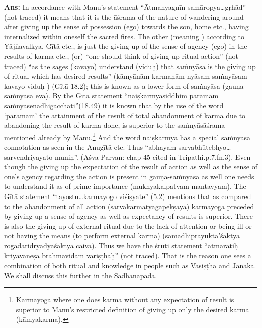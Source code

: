\textbf{Ans:} In accordance with Manu’s statement  “Ātmanyagnīn samāropya\-…gṛhād” (not traced) it means that it is the āśrama of the nature of wandering around after giving up the sense of possession (ego) towards the son, home etc., having internalized within oneself the sacred fires. The other (meaning ) according to Yājñavalkya, Gītā etc., is just the giving up of the sense of agency (ego) in the results of karma etc., (or) “one should think of giving up ritual action” (not traced) “as the sages (kavayo) understand (viduḥ) that saṁnyāsa is the giving up of ritual which has desired results” (kāmyānām karmaṇām nyāsam saṁnyāsam kavayo viduḥ ) (Gītā 18.2); this is known as a lower form of saṁnyāsa (gauṇa saṁnyāsa eva). By the Gītā statement “naiṣkarmyasiddhim paramām saṁnyāsenādhigacchati”(18.49) it  is known that by the use of the word ‘paramām’ the attainment of the result of total abandonment of karma due to abandoning the result of karma done, is superior to the saṁnyāsāśrama mentioned already by Manu.\footnote{Karmayoga where one does karma without any expectation of result is superior to Manu's restricted definition of giving up only the desired karma (kāmyakarma).} And the word naiṣkarmya has a special saṁnyāsa connotation as seen in the Anugītā etc. Thus “abhayam sarvabhūtebhyo…sarvendriyayato muniḥ”. (Aśva-Parvan: chap 45 cited in Tripathi.p.7.fn.3). Even though the giving up the expectation of the result of action as well as the sense of one’s agency regarding the action is present in gauṇa-saṁnyāsa as well one needs to understand it as of prime importance (mukhyakalpatvam mantavyam).  The Gītā statement “tayostu…karmayogo viśiṣyate” (5.2) mentions that as compared to the abandonment of all action (sarvakarmatyāgāpekṣayā) karmayoga preceded by giving up a sense of agency as well as expectancy of results is superior. There is also the giving up of external ritual due to the lack of  attention or being ill or not having the means (to perform external karma) (samādhiprayuktā’śaktyā rogadāridryādyaśaktyā caiva). Thus we have the śruti statement “ātmaratiḥ kriyāvāneṣa brahmavidām variṣṭhaḥ” (not traced). That is the reason one sees a combination of both ritual and knowledge in people such as Vasiṣṭha and Janaka. We shall discuss this further in the Sādhanapāda.

